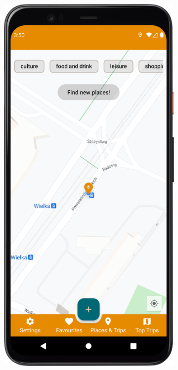         \begin{figure}[H]%
            \centering
            \begin{subfigure}[b]{0.3\textwidth}
                \centering
                \includegraphics[width=\textwidth]{src/app/map_fragment.png}

\end{subfigure}
\end{figure}
